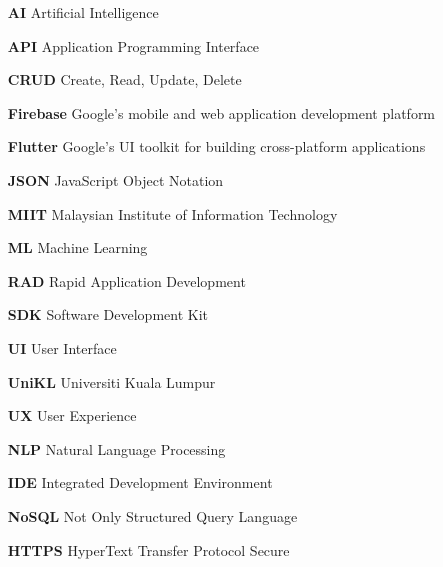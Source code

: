 \begin{Glossary}
\addtolength{\columnsep}{2em}
\begin{multicols}{2}
{
\singlespacing

\begin{enumerate}
\item[\textbf{AI}] 	Artificial Intelligence

\item[\textbf{API}] 	Application Programming Interface

\item[\textbf{CRUD}] 	Create, Read, Update, Delete

\item[\textbf{Firebase}] 	Google's mobile and web application development platform

\item[\textbf{Flutter}] 	Google's UI toolkit for building cross-platform applications

\item[\textbf{JSON}] 	JavaScript Object Notation

\item[\textbf{MIIT}] 	Malaysian Institute of Information Technology

\item[\textbf{ML}] 	Machine Learning

\item[\textbf{RAD}] 	Rapid Application Development

\columnbreak

\item[\textbf{SDK}] 	Software Development Kit

\item[\textbf{UI}] 	User Interface

\item[\textbf{UniKL}] 	Universiti Kuala Lumpur

\item[\textbf{UX}] 	User Experience

\item[\textbf{NLP}] 	Natural Language Processing

\item[\textbf{IDE}] 	Integrated Development Environment

\item[\textbf{NoSQL}] 	Not Only Structured Query Language

\item[\textbf{HTTPS}] 	HyperText Transfer Protocol Secure

\end{enumerate}
}
\end{multicols}
\end{Glossary}